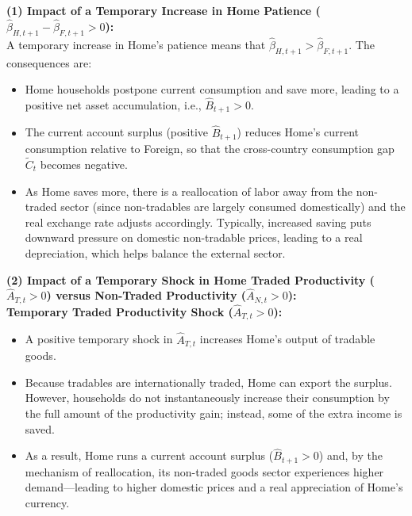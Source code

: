 \documentclass[a4paper,12pt]{article} %
\theoremstyle{nonitalic}
\begin{document}
\textbf{(1) Impact of a Temporary Increase in Home Patience (\( \widehat{\beta}_{H,t+1} - \widehat{\beta}_{F,t+1} > 0 \)):}\\[1mm]
A temporary increase in Home's patience means that \( \widehat{\beta}_{H,t+1} > \widehat{\beta}_{F,t+1} \). The consequences are:
\begin{itemize}
    \item Home households postpone current consumption and save more, leading to a positive net asset accumulation, i.e., \( \widehat{B}_{t+1} > 0 \).
    \item The current account surplus (positive \( \widehat{B}_{t+1} \)) reduces Home's current consumption relative to Foreign, so that the cross-country consumption gap \( \widetilde{C}_t \) becomes negative.
    \item As Home saves more, there is a reallocation of labor away from the non-traded sector (since non-tradables are largely consumed domestically) and the real exchange rate adjusts accordingly. Typically, increased saving puts downward pressure on domestic non-tradable prices, leading to a real depreciation, which helps balance the external sector.
\end{itemize}

\textbf{(2) Impact of a Temporary Shock in Home Traded Productivity (\( \widehat{A}_{T,t} > 0 \)) versus Non-Traded Productivity (\( \widehat{A}_{N,t} > 0 \)):}\\[1mm]
\textbf{Temporary Traded Productivity Shock (\( \widehat{A}_{T,t} > 0 \)):}
\begin{itemize}
    \item A positive temporary shock in \( \widehat{A}_{T,t} \) increases Home's output of tradable goods.
    \item Because tradables are internationally traded, Home can export the surplus. However, households do not instantaneously increase their consumption by the full amount of the productivity gain; instead, some of the extra income is saved.
    \item As a result, Home runs a current account surplus (\( \widehat{B}_{t+1} > 0 \)) and, by the mechanism of reallocation, its non-traded goods sector experiences higher demand—leading to higher domestic prices and a real appreciation of Home's currency.
\end{itemize}
\end{document}
